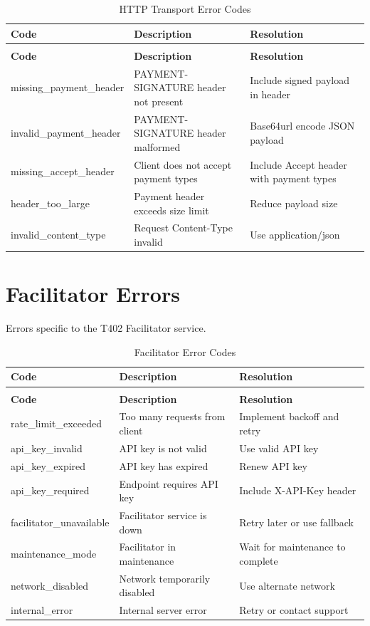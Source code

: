 \begin{longtable}{>{\ttfamily\footnotesize}l p{5cm} p{4cm}}
\caption{HTTP Transport Error Codes} \label{tab:http-errors} \\
\toprule
\normalfont\textbf{Code} & \textbf{Description} & \textbf{Resolution} \\
\midrule
\endfirsthead
\multicolumn{3}{c}{\tablename\ \thetable\ -- continued} \\
\toprule
\normalfont\textbf{Code} & \textbf{Description} & \textbf{Resolution} \\
\midrule
\endhead
\midrule
\endfoot
\bottomrule
\endlastfoot
missing\_payment\_header & PAYMENT-SIGNATURE header not present & Include signed payload in header \\
invalid\_payment\_header & PAYMENT-SIGNATURE header malformed & Base64url encode JSON payload \\
missing\_accept\_header & Client does not accept payment types & Include Accept header with payment types \\
header\_too\_large & Payment header exceeds size limit & Reduce payload size \\
invalid\_content\_type & Request Content-Type invalid & Use application/json \\
\end{longtable}

\section{Facilitator Errors}

Errors specific to the T402 Facilitator service.

\begin{longtable}{>{\ttfamily\footnotesize}l p{5cm} p{4cm}}
\caption{Facilitator Error Codes} \label{tab:facilitator-errors-ref} \\
\toprule
\normalfont\textbf{Code} & \textbf{Description} & \textbf{Resolution} \\
\midrule
\endfirsthead
\multicolumn{3}{c}{\tablename\ \thetable\ -- continued} \\
\toprule
\normalfont\textbf{Code} & \textbf{Description} & \textbf{Resolution} \\
\midrule
\endhead
\midrule
\endfoot
\bottomrule
\endlastfoot
rate\_limit\_exceeded & Too many requests from client & Implement backoff and retry \\
api\_key\_invalid & API key is not valid & Use valid API key \\
api\_key\_expired & API key has expired & Renew API key \\
api\_key\_required & Endpoint requires API key & Include X-API-Key header \\
facilitator\_unavailable & Facilitator service is down & Retry later or use fallback \\
maintenance\_mode & Facilitator in maintenance & Wait for maintenance to complete \\
network\_disabled & Network temporarily disabled & Use alternate network \\
internal\_error & Internal server error & Retry or contact support \\
\end{longtable}

